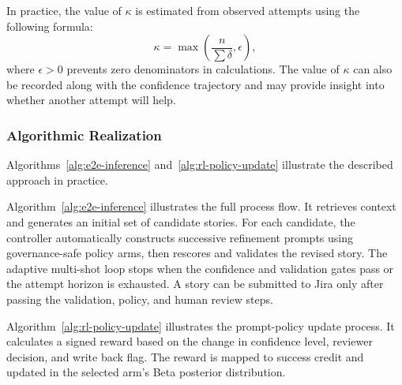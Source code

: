\documentclass[pdflatex,sn-basic]{sn-jnl}
\begin{document}
In practice, the value of \(\kappa\) is estimated from observed attempts using the following formula:
\begin{equation}
\kappa = \max\left(\frac{n}{\sum \delta},\epsilon\right),
\end{equation}
where \(\epsilon>0\) prevents zero denominators in calculations.
The value of \(\kappa\) can also be recorded along with the confidence trajectory and may provide insight into whether another attempt will help.

\subsubsection{Algorithmic Realization}
Algorithms~\ref{alg:e2e-inference} and~\ref{alg:rl-policy-update}
illustrate the described approach in practice.

Algorithm~\ref{alg:e2e-inference} illustrates the full process flow.
It retrieves context and generates an initial set of candidate stories.
For each candidate, the controller automatically constructs successive refinement prompts using governance-safe policy arms, then rescores and validates the revised story. The adaptive multi-shot loop stops when the confidence and validation gates pass or the attempt horizon is exhausted.
A story can be submitted to Jira only after passing the validation, policy, and human review steps.

Algorithm~\ref{alg:rl-policy-update} illustrates the prompt-policy update process.
It calculates a signed reward based on the change in confidence level, reviewer decision, and write back flag.
The reward is mapped to success credit and updated in the selected arm's Beta posterior distribution.
\end{document}
